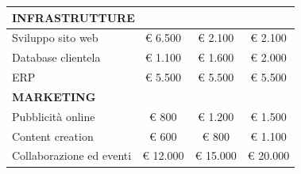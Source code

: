 \documentclass[12pt, a4paper]{article}
\begin{document}
\begin{longtable}{|lccc|}
    \multicolumn{4}{|l|}{\textbf{INFRASTRUTTURE}}                                                                                                                                                                                                                                                               \\ \hline
    \multicolumn{1}{|l|}{Sviluppo sito web}                                                                                                               & \multicolumn{1}{c|}{€ 6.500}                                   & \multicolumn{1}{c|}{€ 2.100}                                   & € 2.100           \\ \hline
    \multicolumn{1}{|l|}{Database clientela}                                                                                                              & \multicolumn{1}{c|}{€ 1.100}                                   & \multicolumn{1}{c|}{€ 1.600}                                   & € 2.000           \\ \hline
    \multicolumn{1}{|l|}{ERP}                                                                                                                             & \multicolumn{1}{c|}{€ 5.500}                                   & \multicolumn{1}{c|}{€ 5.500}                                   & € 5.500           \\ \hline
    \multicolumn{4}{|l|}{\textbf{MARKETING}}                                                                                                                                                                                                                                                                    \\ \hline
    \multicolumn{1}{|l|}{Pubblicità online}                                                                                                               & \multicolumn{1}{c|}{€ 800}                                     & \multicolumn{1}{c|}{€ 1.200}                                   & € 1.500           \\ \hline
    \multicolumn{1}{|l|}{Content creation}                                                                                                                & \multicolumn{1}{c|}{€ 600}                                     & \multicolumn{1}{c|}{€ 800}                                     & € 1.100           \\ \hline
    \multicolumn{1}{|l|}{Collaborazione ed eventi}                                                                                                        & \multicolumn{1}{c|}{€ 12.000}                                  & \multicolumn{1}{c|}{€ 15.000}                                  & € 20.000          \\ \hline

\end{longtable}
\end{document}
